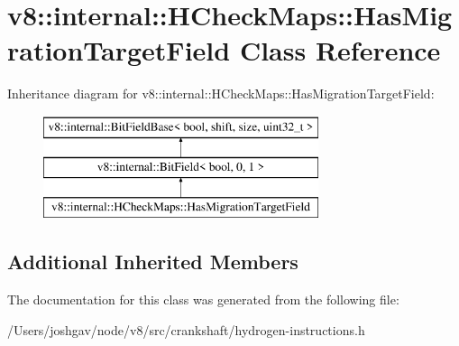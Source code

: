 \hypertarget{classv8_1_1internal_1_1_h_check_maps_1_1_has_migration_target_field}{}\section{v8\+:\+:internal\+:\+:H\+Check\+Maps\+:\+:Has\+Migration\+Target\+Field Class Reference}
\label{classv8_1_1internal_1_1_h_check_maps_1_1_has_migration_target_field}
Inheritance diagram for v8\+:\+:internal\+:\+:H\+Check\+Maps\+:\+:Has\+Migration\+Target\+Field\+:\begin{figure}[H]
\begin{center}
\leavevmode
\includegraphics[height=3.000000cm]{classv8_1_1internal_1_1_h_check_maps_1_1_has_migration_target_field}
\end{center}
\end{figure}
\subsection*{Additional Inherited Members}


The documentation for this class was generated from the following file\+:\begin{DoxyCompactItemize}
\item 
/\+Users/joshgav/node/v8/src/crankshaft/hydrogen-\/instructions.\+h\end{DoxyCompactItemize}
